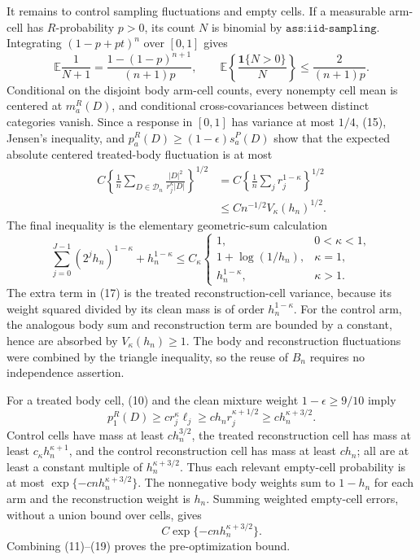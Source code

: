 It remains to control sampling fluctuations and empty cells. If a measurable arm-cell has \(R\)-probability \(p>0\), its count \(N\) is binomial by \(\texttt{ass:iid-sampling}\). Integrating \((1-p+pt)^n\) over \([0,1]\) gives
\[
\mathbb E\frac1{N+1}=\frac{1-(1-p)^{n+1}}{(n+1)p},
\qquad
\mathbb E\left\{\frac{\mathbf1\{N>0\}}N\right\}
\leq\frac2{(n+1)p}.
\tag{15}
\]
Conditional on the disjoint body arm-cell counts, every nonempty cell mean is centered at \(m_a^R(D)\), and conditional cross-covariances between distinct categories vanish. Since a response in \([0,1]\) has variance at most \(1/4\), (15), Jensen's inequality, and \(p_a^R(D)\geq(1-\epsilon)s_a^P(D)\) show that the expected absolute centered treated-body fluctuation is at most
\[
\begin{aligned}
C\left\{\frac1n\sum_{D\in\mathcal D_n}
\frac{|D|^2}{r_j^\kappa|D|}\right\}^{1/2}
&=C\left\{\frac1n\sum_jr_j^{1-\kappa}\right\}^{1/2}\\
&\leq Cn^{-1/2}V_\kappa(h_n)^{1/2}.
\end{aligned}
\tag{16}
\]
The final inequality is the elementary geometric-sum calculation
\[
\sum_{j=0}^{J-1}(2^jh_n)^{1-\kappa}+h_n^{1-\kappa}
\leq C_\kappa
\begin{cases}
1,&0<\kappa<1,\\
1+\log(1/h_n),&\kappa=1,\\
h_n^{1-\kappa},&\kappa>1.
\end{cases}
\tag{17}
\]
The extra term in (17) is the treated reconstruction-cell variance, because its weight squared divided by its clean mass is of order \(h_n^{1-\kappa}\). For the control arm, the analogous body sum and reconstruction term are bounded by a constant, hence are absorbed by \(V_\kappa(h_n)\geq1\). The body and reconstruction fluctuations were combined by the triangle inequality, so the reuse of \(B_n\) requires no independence assertion.

For a treated body cell, (10) and the clean mixture weight \(1-\epsilon\geq9/10\) imply
\[
p_1^R(D)\geq c r_j^\kappa\ell_j
\geq c h_nr_j^{\kappa+1/2}
\geq c h_n^{\kappa+3/2}.
\tag{18}
\]
Control cells have mass at least \(c h_n^{3/2}\), the treated reconstruction cell has mass at least \(c_\kappa h_n^{\kappa+1}\), and the control reconstruction cell has mass at least \(ch_n\); all are at least a constant multiple of \(h_n^{\kappa+3/2}\). Thus each relevant empty-cell probability is at most \(\exp\{-cnh_n^{\kappa+3/2}\}\). The nonnegative body weights sum to \(1-h_n\) for each arm and the reconstruction weight is \(h_n\). Summing weighted empty-cell errors, without a union bound over cells, gives
\[
C\exp\{-cnh_n^{\kappa+3/2}\}.
\tag{19}
\]
Combining (11)--(19) proves the pre-optimization bound.

